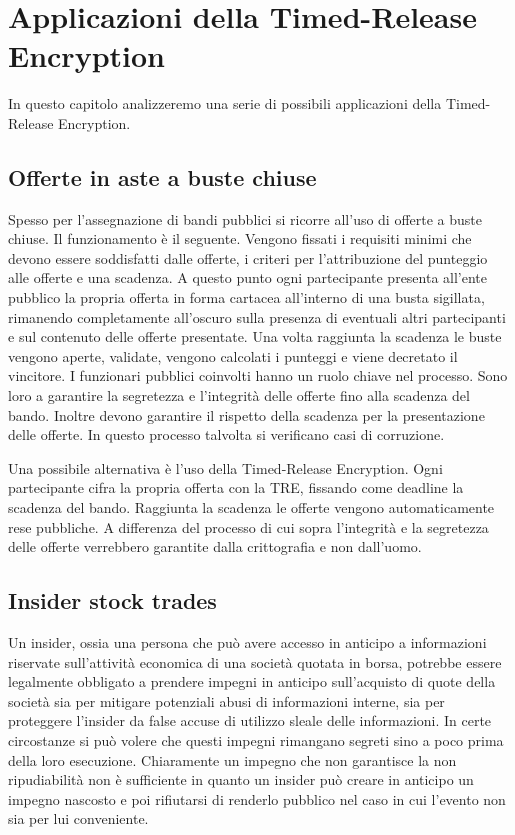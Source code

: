 \chapter{Applicazioni della Timed-Release Encryption}
\label{chap:possibili-usi}

In questo capitolo analizzeremo una serie di possibili
applicazioni della Timed-Release Encryption.

\section{Offerte in aste a buste chiuse}
Spesso per l'assegnazione di bandi pubblici si ricorre all'uso di
offerte a buste chiuse. Il funzionamento è il seguente.
Vengono fissati i requisiti minimi che devono essere soddisfatti
dalle offerte, i criteri per l'attribuzione del punteggio alle offerte e una scadenza.
A questo punto ogni partecipante presenta all'ente pubblico
la propria offerta in forma cartacea
all'interno di una busta sigillata, rimanendo
completamente all'oscuro sulla presenza di eventuali altri partecipanti e sul
contenuto delle offerte presentate. Una volta raggiunta la scadenza
le buste vengono aperte, validate, vengono calcolati i punteggi
e viene decretato il vincitore.
I funzionari pubblici coinvolti hanno un ruolo chiave nel processo.
Sono loro a garantire la segretezza e l'integrità
delle offerte fino alla scadenza del bando.
Inoltre devono garantire il rispetto della scadenza per la presentazione delle offerte.
In questo processo talvolta si verificano casi di corruzione.

Una possibile alternativa è l'uso della Timed-Release Encryption. Ogni partecipante
cifra la propria offerta con la TRE, fissando come deadline la scadenza del bando.
Raggiunta la scadenza le offerte vengono automaticamente rese pubbliche. A differenza
del processo di cui sopra l'integrità
e la segretezza delle offerte verrebbero garantite dalla crittografia e non dall'uomo.

\section{Insider stock trades}
Un insider, ossia una persona che può avere accesso in anticipo a informazioni
riservate sull’attività economica di una società quotata in borsa,
potrebbe essere legalmente obbligato a
prendere impegni in anticipo sull'acquisto di quote della società
sia per mitigare potenziali
abusi di informazioni interne, sia per proteggere l'insider da false
accuse di utilizzo sleale delle informazioni.
In certe circostanze
si può volere che questi impegni rimangano segreti sino a poco prima
della loro esecuzione. Chiaramente un impegno che non garantisce la non ripudiabilità
non è sufficiente in quanto un insider può creare in anticipo un impegno nascosto
e poi rifiutarsi di renderlo pubblico nel caso in cui l'evento non sia per lui conveniente.

